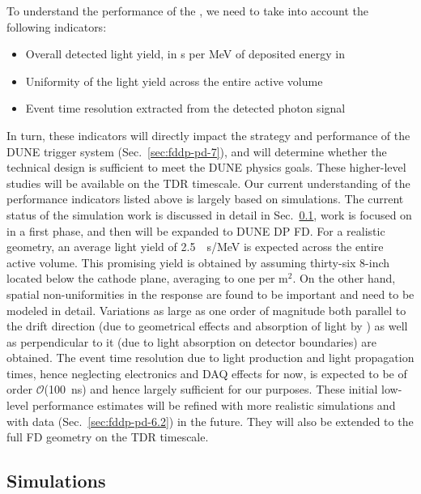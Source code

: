 To understand the performance of the , we need to take into account the following indicators:
\begin{itemize}
\item Overall detected light yield, in \phel{}s per MeV of deposited energy in \lar
\item Uniformity of the light yield across the entire \lartpc active volume
\item Event time resolution extracted from the detected photon signal 
\end{itemize}

In turn, these indicators will directly impact the strategy and performance of the DUNE trigger system (Sec.~\ref{sec:fddp-pd-7}), and will determine whether the  technical design is sufficient to meet the DUNE physics goals. These higher-level studies will be available on the TDR timescale. Our current understanding of the performance indicators listed above is largely based on  simulations. The current status of the simulation work is discussed in detail in Sec.~\ref{sec:fddp-pd-6.1}, work is focused on  in a first phase, and then will be expanded to DUNE DP FD. For a realistic  geometry, an average light yield of \SI{2.5}{\phel{}s/MeV} is expected across the entire active volume. This promising yield is obtained  by assuming thirty-six 8-inch  located below the  cathode plane, averaging to one  per m$^2$. On the other hand, spatial non-uniformities in the  response are found to be important and need to be modeled in detail. Variations as large as one order of magnitude both parallel to the drift direction (due to geometrical effects and absorption of light by \lar) as well as perpendicular to it (due to light absorption on detector boundaries) are obtained. The event time resolution due to light production and light propagation times, hence neglecting electronics and DAQ effects for now, is expected to be of order $\mathcal{O}$(\SI{100}{ns}) and hence largely sufficient for our purposes. These initial low-level performance estimates will be refined with more realistic simulations and with  data (Sec.~\ref{sec:fddp-pd-6.2}) in the future. They will also be extended to the full FD geometry on the TDR timescale.

\subsection{Simulations}
\label{sec:fddp-pd-6.1}

